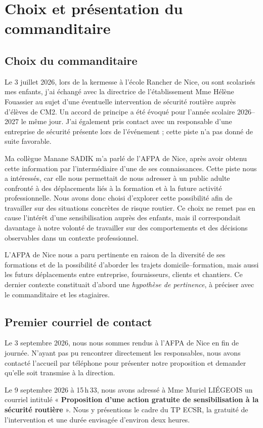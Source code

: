 \chapter{Choix et présentation du commanditaire}

\section{Choix du commanditaire}
Le 3 juillet 2026, lors de la kermesse à l'école Rancher de Nice, ou sont scolarisés mes enfants, j'ai échangé avec la directrice de l'établissement Mme Hélène Fouassier au sujet d'une éventuelle intervention de sécurité routière auprès d'élèves de CM2. Un accord de principe a été évoqué pour l'année scolaire 2026--2027 le même jour. J'ai également pris contact avec un responsable d'une entreprise de sécurité présente lors de l'événement ; cette piste n'a pas donné de suite favorable.

Ma collègue Manane SADIK m’a parlé de l’AFPA de Nice, après avoir obtenu cette information par l’intermédiaire d’une de ses connaissances. Cette piste nous a intéressés, car elle nous permettait de nous adresser à un public adulte confronté à des déplacements liés à la formation et à la future activité professionnelle. Nous avons donc choisi d’explorer cette possibilité afin de travailler sur des situations concrètes de risque routier. Ce choix ne remet pas en cause l’intérêt d’une sensibilisation auprès des enfants, mais il correspondait davantage à notre volonté de travailler sur des comportements et des décisions observables dans un contexte professionnel.

L'AFPA de Nice nous a paru pertinente en raison de la diversité de ses formations et de la possibilité d'aborder les trajets domicile--formation, mais aussi les futurs déplacements entre entreprise, fournisseurs, clients et chantiers. Ce dernier contexte constituait d'abord une \emph{hypothèse de pertinence}, à préciser avec le commanditaire et les stagiaires.

\section{Premier courriel de contact}
Le 3 septembre 2026, nous nous sommes rendus à l'AFPA de Nice en fin de journée. N'ayant pas pu rencontrer directement les responsables, nous avons contacté l'accueil par téléphone pour présenter notre proposition et demander qu'elle soit transmise à la direction.

Le 9 septembre 2026 à 15\,h\,33, nous avons adressé à Mme Muriel LIÉGEOIS un courriel intitulé « \textbf{Proposition d'une action gratuite de sensibilisation à la sécurité routière} ». Nous y présentions le cadre du TP ECSR, la gratuité de l'intervention et une durée envisagée d'environ deux heures.

